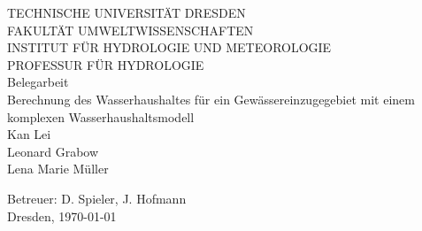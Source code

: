 \documentclass[10pt,a4paper, ngerman]{article}
\begin{document}

\begin{titlepage}
	\enlargethispage{1cm}
	\begin{center}
		\LARGE \uppercase{Technische Universität Dresden}
		\vspace{0,5cm}\\
		\large \uppercase{Fakultät Umweltwissenschaften\\Institut für Hydrologie und Meteorologie\\Professur für Hydrologie}
		\vspace{3cm}\\     
		\Large Belegarbeit
		\vspace{2cm}\\     
		\quad
		\huge Berechnung des Wasserhaushaltes für ein Gewässereinzugegebiet mit einem komplexen Wasserhaushaltsmodell
		\vspace{1cm}\\
		\Large Kan Lei\\Leonard Grabow\\Lena Marie Müller
	\end{center}
	\vspace{3cm}
	\begin{flushleft}
		\Large Betreuer: D. Spieler, J. Hofmann\\
		\vspace{1cm}
		Dresden, \today
		\vspace{3cm}
	\end{flushleft}
	\end{titlepage}
	\pagestyle{empty}
	\cleardoublepage


\cleardoublepage

\newpage
\end{document}
